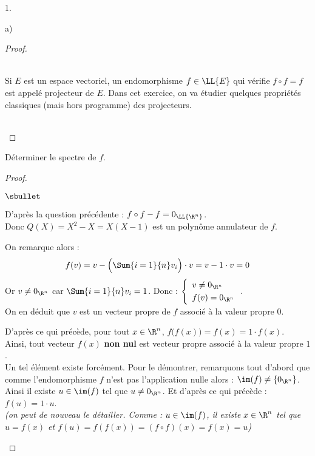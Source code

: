 \documentclass[11pt]{article}%
\begin{document}
\begin{noliste}{1.}
\begin{noliste}{a)}
\begin{proof}
      \begin{remark}~\\
        Si $E$ est un espace vectoriel, un endomorphisme $f \in
        \LL{E}$ qui vérifie $f \circ f = f$ est appelé projecteur de
        $E$. Dans cet exercice, on va étudier quelques propriétés
        classiques (mais hors programme) des projecteurs.
      \end{remark}~\\[-1.4cm]
    \end{proof}
  \end{noliste}
 
 \item Déterminer le spectre de $f$.
 
   \begin{proof}~
     \begin{noliste}{$\sbullet$}
     \item D'après la question précédente : $f\circ
       f-f=0_{\LL{\R^n}}$.\\[.1cm]
       Donc $Q(X) = X^2-X = X(X-1)$ est un polynôme annulateur de
       $f$.%

     \item On remarque alors :
       \[
       f(v) = v - \Big(\Sum{i=1}{n} v_i \Big) \cdot v = v - 1 \cdot v
       = 0
       \]
       Or $v\neq 0_{\R^n}$ car $\Sum{i=1}{n} v_i =1$. Donc :
       $\left\{
         \begin{array}{l}
           v \neq 0_{\R^n}\\[.1cm]
           f(v)=0_{\R^n}
         \end{array}
       \right.$.\\[.2cm]
       On en déduit que $v$ est un vecteur propre de $f$ associé à la
       valeur propre $0$. %

     \item D'après ce qui précède, pour tout $x \in \R^n$, $f\big(
       f(x) \big) = f(x) = 1 \cdot f(x)$.\\
       Ainsi, tout vecteur $f(x)$ {\bf non nul} est vecteur propre
       associé à la valeur propre $1$.\\
       Un tel élément existe forcément. Pour le démontrer, remarquons
       tout d'abord que comme l'endomorphisme $f$ n'est pas
       l'application nulle alors : $\im(f) \neq \{0_{\R^n}\}$.\\
       Ainsi il existe $u \in \im(f)$ tel que $u \neq
       0_{\R^n}$. Et d'après ce qui précède : $f(u) = 1 \cdot u$.\\[.1cm]
       {\it (on peut de nouveau le détailler. Comme : $u\in \im(f)$,
         il existe $x \in \R^n$ tel que $u = f(x)$ et $f(u) = f(f(x))
         = (f\circ f)(x) = f(x) =u$)}%
     \end{noliste}



\end{proof}
\end{noliste}
\end{document}
